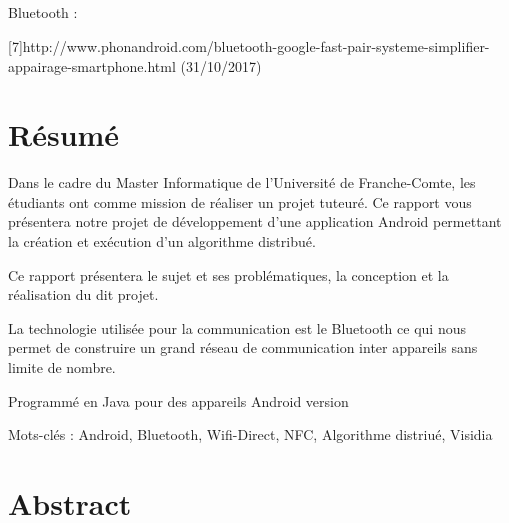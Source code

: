 \documentclass[a4paper,10pt]{report}
\begin{document}
 \paragraph{}
 Bluetooth :

 [7]http://www.phonandroid.com/bluetooth-google-fast-pair-systeme-simplifier-appairage-smartphone.html (31/10/2017)
 
 \chapter*{Résumé}
 Dans le cadre du Master Informatique de l'Université de Franche-Comte, les étudiants ont comme mission de réaliser un projet tuteuré. Ce rapport vous présentera notre projet de développement d'une application Android permettant la création et exécution d'un algorithme distribué.
 
 Ce rapport présentera le sujet et ses problématiques, la conception et la réalisation du dit projet.
 
 La technologie utilisée pour la communication est le Bluetooth ce qui nous permet de construire un grand réseau de communication inter appareils sans limite de nombre.
 
 Programmé en Java  pour des appareils Android version 
 
 Mots-clés : Android, Bluetooth, Wifi-Direct, NFC, Algorithme distriué, Visidia 
 
 \chapter*{Abstract}
\end{document}
